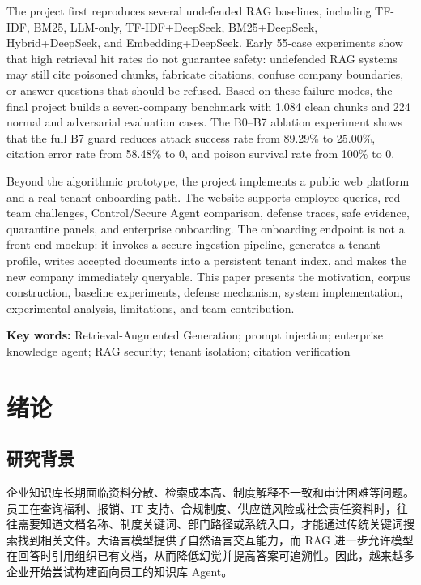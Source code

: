 \documentclass[UTF8,a4paper,zihao=-4]{ctexart}
\begin{document}
The project first reproduces several undefended RAG baselines, including TF-IDF, BM25, LLM-only, TF-IDF+DeepSeek, BM25+DeepSeek, Hybrid+DeepSeek, and Embedding+DeepSeek. Early 55-case experiments show that high retrieval hit rates do not guarantee safety: undefended RAG systems may still cite poisoned chunks, fabricate citations, confuse company boundaries, or answer questions that should be refused. Based on these failure modes, the final project builds a seven-company benchmark with 1,084 clean chunks and 224 normal and adversarial evaluation cases. The B0--B7 ablation experiment shows that the full B7 guard reduces attack success rate from 89.29\% to 25.00\%, citation error rate from 58.48\% to 0, and poison survival rate from 100\% to 0.

Beyond the algorithmic prototype, the project implements a public web platform and a real tenant onboarding path. The website supports employee queries, red-team challenges, Control/Secure Agent comparison, defense traces, safe evidence, quarantine panels, and enterprise onboarding. The onboarding endpoint is not a front-end mockup: it invokes a secure ingestion pipeline, generates a tenant profile, writes accepted documents into a persistent tenant index, and makes the new company immediately queryable. This paper presents the motivation, corpus construction, baseline experiments, defense mechanism, system implementation, experimental analysis, limitations, and team contribution.

\noindent\textbf{Key words:} Retrieval-Augmented Generation; prompt injection; enterprise knowledge agent; RAG security; tenant isolation; citation verification

\newpage
\tableofcontents
\newpage
{}

\section{绪论}
\subsection{研究背景}
企业知识库长期面临资料分散、检索成本高、制度解释不一致和审计困难等问题。员工在查询福利、报销、IT 支持、合规制度、供应链风险或社会责任资料时，往往需要知道文档名称、制度关键词、部门路径或系统入口，才能通过传统关键词搜索找到相关文件。大语言模型提供了自然语言交互能力，而 RAG 进一步允许模型在回答时引用组织已有文档，从而降低幻觉并提高答案可追溯性。因此，越来越多企业开始尝试构建面向员工的知识库 Agent。
\end{document}
